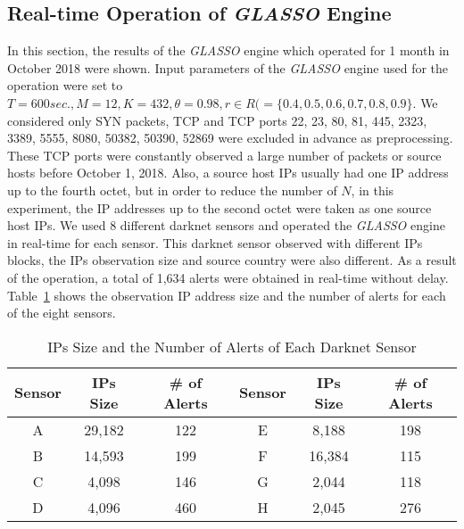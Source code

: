 \documentclass[conference]{IEEEtran}
\begin{document}
\subsection{Real-time Operation of {\it GLASSO} Engine}
In this section, the results of the {\it GLASSO} engine which operated for 1 month in October 2018 were shown.
Input parameters of the {\it GLASSO} engine used for the operation were set to $T=600 sec., M=12, K=432, \theta=0.98, r \in R ( = \{0.4, 0.5, 0.6, 0.7, 0.8, 0.9\}$.
We considered only SYN packets, TCP and TCP ports 22, 23, 80, 81, 445, 2323, 3389, 5555, 8080, 50382, 50390, 52869 were excluded in advance as preprocessing.
These TCP ports were constantly observed a large number of packets or source hosts before October 1, 2018.
Also, a source host IPs usually had one IP address up to the fourth octet, but in order to reduce the number of $N$, in this experiment, the IP addresses up to the second octet were taken as one source host IPs.
We used 8 different darknet sensors and operated the {\it GLASSO} engine in real-time for each sensor.
This darknet sensor observed with different IPs blocks, the IPs observation size and source country were also different.
As a result of the operation, a total of 1,634 alerts were obtained in real-time without delay.
Table~\ref{tab:sensor} shows the observation IP address size and the number of alerts for each of the eight sensors.

\begin{table}[tb]
  \begin{center}
    \caption{IPs Size and the Number of Alerts of Each Darknet Sensor}
  \begin{tabular}{c|c|c||c|c|c} \hline
  Sensor & IPs Size & \# of Alerts & Sensor & IPs Size & \# of Alerts \\ \hline\hline
  A & 29,182 & 122 & E & 8,188 & 198 \\ \hline
  B & 14,593 & 199 & F & 16,384 & 115 \\ \hline
  C & 4,098 & 146 & G & 2,044 & 118 \\ \hline
  D & 4,096 & 460 & H & 2,045 & 276 \\ \hline
  \end{tabular}
  \label{tab:sensor}
  \end{center}
\end{table}
\end{document}
